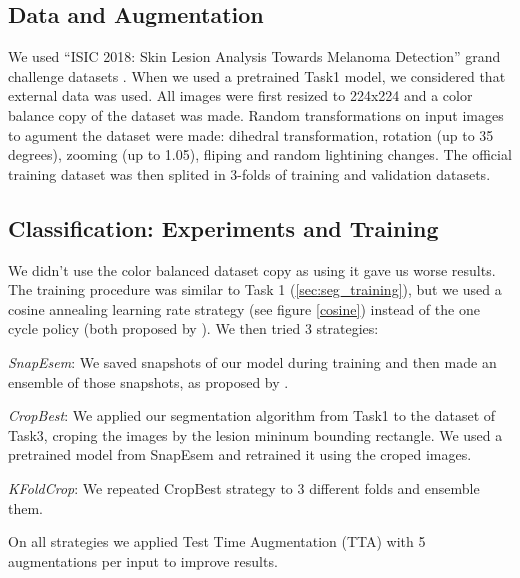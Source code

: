 \documentclass[conference]{IEEEtran}
\begin{document}
\subsection{Data and Augmentation}
We used “ISIC 2018: Skin Lesion Analysis Towards Melanoma Detection” grand challenge datasets \cite{codella, ham}. When we used a pretrained Task1 model, we considered that external data was used. All images were first resized to 224x224 and a color balance copy of the dataset was made. Random transformations on input images to agument the dataset were made: dihedral transformation, rotation (up to 35 degrees), zooming (up to 1.05), fliping and random lightining changes. The official training dataset was then splited in 3-folds of training and validation datasets.  


\subsection{Classification: Experiments and Training}



We didn't use the color balanced dataset copy as using it gave us worse results. The training procedure was similar to Task 1 (\ref{sec:seg_training}), but we used a cosine annealing learning rate strategy (see figure \ref{cosine}) instead of the one cycle policy (both proposed by \cite{leslie}). We then tried 3 strategies:

\emph{SnapEsem}: We saved snapshots of our model during training and then made an ensemble of those snapshots, as proposed by \cite{snapshots}.

\emph{CropBest}: We applied our segmentation algorithm from Task1 to the dataset of Task3, croping the images by the lesion mininum bounding rectangle. We used a pretrained model from SnapEsem and retrained it using the croped images.

\emph{KFoldCrop}: We repeated CropBest strategy to 3 different folds and ensemble them. 

On all strategies we applied Test Time Augmentation (TTA) with 5 augmentations per input to improve results.
\end{document}
